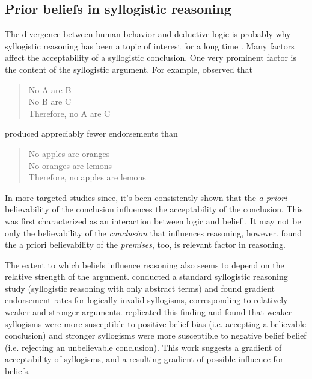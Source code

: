 \documentclass{article} %
\begin{document}
\subsection{Prior beliefs in syllogistic reasoning}

The divergence between human behavior and deductive logic is probably why syllogistic reasoning has been a topic of interest for a long time \cite{Storring1908,Woodworth1935, Chapman1959, JL1978, Chater1999}. Many factors affect the acceptability of a syllogistic conclusion. One very prominent factor is the content of the syllogistic argument. For example,  observed that

\begin{quote}
No A are B\\
No B are C\\
Therefore, no A are C
\end{quote}

produced appreciably fewer endorsements than 

\begin{quote}
No apples are oranges\\
No oranges are lemons\\
Therefore, no apples are lemons
\end{quote}

In more targeted studies since, it's been consistently shown that the \emph{a priori} believability of the conclusion influences the acceptability of the conclusion. This was first characterized as an interaction between logic and belief \cite{Evans1983}. It may not be only the believability of the \emph{conclusion} that influences reasoning, however.  found the a priori believability of the \emph{premises}, too, is relevant factor in reasoning. 


The extent to which beliefs influence reasoning also seems to depend on the relative strength of the argument.  conducted a standard syllogistic reasoning study (syllogistic reasoning with only abstract terms) and found gradient endorsement rates for logically invalid syllogisms, corresponding to relatively weaker and stronger arguments.  replicated this finding and found that weaker syllogisms were more susceptible to positive belief bias (i.e. accepting a believable conclusion) and stronger syllogisms were more susceptible to negative belief belief (i.e. rejecting an unbelievable conclusion). This work suggests a gradient of acceptability of syllogisms, and a resulting gradient of possible influence for beliefs. 
\end{document}
